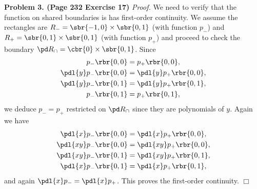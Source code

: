 \documentclass[english, nochinese]{pnote}
\begin{document}
\textbf{Problem 3. (Page 232 Exercise 17)} \textit{Proof.} We need to verify that the function on shared boundaries is has first-order continuity. We assume the rectangles are $ R_- = \sbr{ -1, 0 } \times \sbr{ 0, 1 } $ (with function $p_-$) and $ R_+ = \sbr{ 0, 1 } \times \sbr{ 0, 1 } $ (with function $p_+$) and proceed to check the boundary $ \pd R_{\cap} = \cbr{0} \times \sbr{ 0, 1 } $. Since
\begin{gather}
p_- \rbr{ 0, 0 } = p_+ \rbr{ 0, 0 }, \\
\pdl{y} p_- \rbr{ 0, 0 } = \pdl{y} p_+ \rbr{ 0, 0 }, \\
\pdl{y} p_- \rbr{ 0, 1 } = \pdl{y} p_+ \rbr{ 0, 1 }, \\
p_- \rbr{ 0, 1 } = p_+ \rbr{ 0, 1 },
\end{gather}
we deduce $ p_- = p_+ $ restricted on $ \pd R_{\cap} $ since they are polynomials of $y$. Again we have
\begin{gather}
\pdl{x} p_- \rbr{ 0, 0 } = \pdl{x} p_+ \rbr{ 0, 0 }, \\
\pdl{ x y } p_- \rbr{ 0, 0 } = \pdl{ x y } p_+ \rbr{ 0, 0 }, \\
\pdl{ x y } p_- \rbr{ 0, 1 } = \pdl{ x y } p_+ \rbr{ 0, 1 }, \\
\pdl{x} p_- \rbr{ 0, 1 } = \pdl{x} p_+ \rbr{ 0, 1 },
\end{gather}
and again $ \pdl{x} p_- = \pdl{x} p_+ $. This proves the first-order continuity.
\hfill$\Box$
\end{document}

